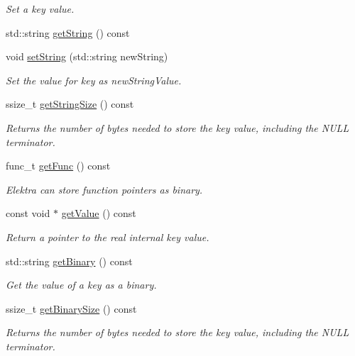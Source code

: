 \begin{DoxyCompactItemize}
\begin{DoxyCompactList}\small\item\em Set a key value. \end{DoxyCompactList}\item 
std\+::string \hyperlink{classkdb_1_1Key_af612ede3a73e57b317a65e40e7f9e01b}{get\+String} () const
\item 
void \hyperlink{classkdb_1_1Key_ab97ef37aa235f0ae04dc6e6c21109d1a}{set\+String} (std\+::string new\+String)
\begin{DoxyCompactList}\small\item\em Set the value for {\ttfamily key} as {\ttfamily new\+String\+Value}. \end{DoxyCompactList}\item 
ssize\+\_\+t \hyperlink{classkdb_1_1Key_a4cfc9941a93a94b306b8264d0d21abc2}{get\+String\+Size} () const
\begin{DoxyCompactList}\small\item\em Returns the number of bytes needed to store the key value, including the N\+U\+LL terminator. \end{DoxyCompactList}\item 
func\+\_\+t \hyperlink{classkdb_1_1Key_aa9643866a567ba5f012a3e9ab2a91721}{get\+Func} () const
\begin{DoxyCompactList}\small\item\em Elektra can store function pointers as binary. \end{DoxyCompactList}\item 
const void $\ast$ \hyperlink{classkdb_1_1Key_a444c6f254536196a7031288e9f4c3088}{get\+Value} () const
\begin{DoxyCompactList}\small\item\em Return a pointer to the real internal {\ttfamily key} value. \end{DoxyCompactList}\item 
std\+::string \hyperlink{classkdb_1_1Key_ada114aba31b321ddc984018b43a8568b}{get\+Binary} () const
\begin{DoxyCompactList}\small\item\em Get the value of a key as a binary. \end{DoxyCompactList}\item 
ssize\+\_\+t \hyperlink{classkdb_1_1Key_af33a66e7b35c0ec6f9a65105257f21aa}{get\+Binary\+Size} () const
\begin{DoxyCompactList}\small\item\em Returns the number of bytes needed to store the key value, including the N\+U\+LL terminator. \end{DoxyCompactList}\item 

\end{DoxyCompactItemize}
